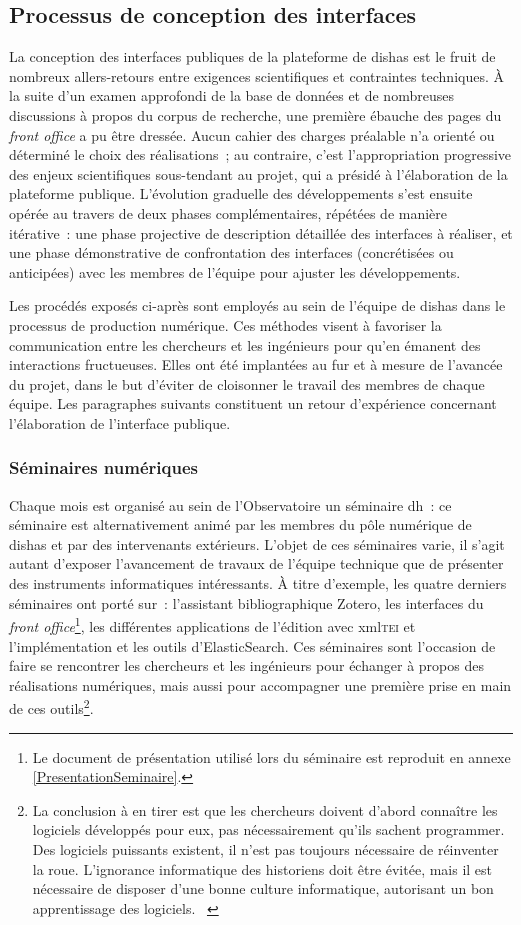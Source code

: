 \documentclass[a4paper,12pt,twoside]{book}
\newcommand{\eng}{\emph}
\newcommand{\bdd}{base de données\xspace}
\newcommand{\fo}{\eng{front office}\xspace}
\newcommand{\g}[1]{\og#1~\fg}
\newcommand{\dishas}{\gls{dishas}\xspace}
\newcommand{\xml}{\gls{xml}\xspace}
\newcommand{\dhu}{\gls{dh}\xspace}
\begin{document}
		\subsection{Processus de conception des interfaces}
La conception des interfaces publiques de la plateforme de \dishas est le fruit de nombreux allers-retours entre exigences scientifiques et contraintes techniques. À la suite d'un examen approfondi de la \bdd et de nombreuses discussions à propos du corpus de recherche, une première ébauche des pages du \fo a pu être dressée. Aucun cahier des charges préalable n'a orienté ou déterminé le choix des réalisations~; au contraire, c'est l'appropriation progressive des enjeux scientifiques sous-tendant au projet, qui a présidé à l'élaboration de la plateforme publique. L'évolution graduelle des développements s'est ensuite opérée au travers de deux phases complémentaires, répétées de manière itérative~: une phase projective de description détaillée des interfaces à réaliser, et une phase démonstrative de confrontation des interfaces (concrétisées ou anticipées) avec les membres de l'équipe pour ajuster les développements.

Les procédés exposés ci-après sont employés au sein de l'équipe de \dishas dans le processus de production numérique. Ces méthodes visent à favoriser la communication entre les chercheurs et les ingénieurs pour qu'en émanent des interactions fructueuses. Elles ont été implantées au fur et à mesure de l'avancée du projet, dans le but d'éviter de cloisonner le travail des membres de chaque équipe. Les paragraphes suivants constituent un retour d'expérience concernant l'élaboration de l'interface publique.

				\subsubsection{Séminaires numériques}
Chaque mois est organisé au sein de l'Observatoire un séminaire \dhu~: ce séminaire est alternativement animé par les membres du pôle numérique de \dishas et par des intervenants extérieurs. L'objet de ces séminaires varie, il s'agit autant d'exposer l'avancement de travaux de l'équipe technique que de présenter des instruments informatiques intéressants. À titre d'exemple, les quatre derniers séminaires ont porté sur~: l'assistant bibliographique Zotero, les interfaces du \fo\footnote{Le document de présentation utilisé lors du séminaire est reproduit en annexe \ref{PresentationSeminaire}.}, les différentes applications de l'édition avec \xml \textsc{tei} et l'implémentation et les outils d'ElasticSearch. Ces séminaires sont l'occasion de faire se rencontrer les chercheurs et les ingénieurs pour échanger à propos des réalisations numériques, mais aussi pour accompagner une première prise en main de ces outils\footnote{\g{La conclusion à en tirer est que les chercheurs doivent d’abord connaître les logiciels développés pour eux, pas nécessairement qu’ils sachent programmer. Des logiciels puissants existent, il n’est pas toujours nécessaire de réinventer la roue. L’ignorance informatique des historiens doit être évitée, mais il est nécessaire de disposer d’une bonne culture informatique, autorisant un bon apprentissage des logiciels.} \cite[§~21]{clavertHistorienProgrammeur2012}}.
\end{document}
